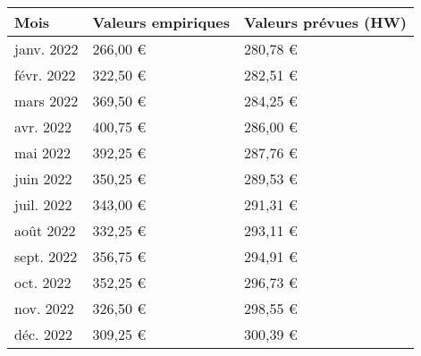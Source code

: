 \begin{tabular}{|l|l|l|}
	\toprule
		Mois & Valeurs empiriques & Valeurs prévues (HW) \\ \hline
         janv. 2022 & 266,00 € & 280,78 € \\ \hline
         févr. 2022 & 322,50 € & 282,51 € \\ \hline
         mars 2022 & 369,50 € & 284,25 € \\ \hline
         avr. 2022 & 400,75 € & 286,00 € \\ \hline
         mai 2022 & 392,25 € & 287,76 € \\ \hline
         juin 2022 & 350,25 € & 289,53 € \\ \hline
         juil. 2022 & 343,00 € & 291,31 € \\ \hline
         août 2022 & 332,25 € & 293,11 € \\ \hline
         sept. 2022 & 356,75 € & 294,91 € \\ \hline
         oct. 2022 & 352,25 € & 296,73 € \\ \hline
         nov. 2022 & 326,50 € & 298,55 € \\ \hline
         déc. 2022 & 309,25 € & 300,39 € \\ \hline
    \end{tabular}
